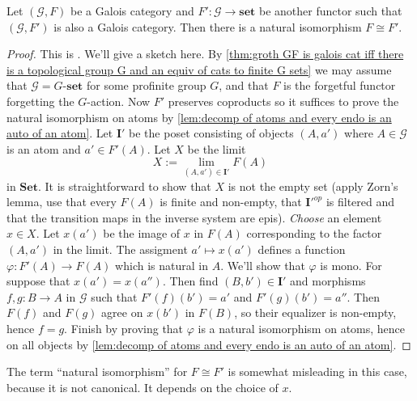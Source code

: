\begin{corollary}
\label{coro:Every two fundamental functors are naturally isomorphic}
Let $(\mathscr{G},F)$ be a Galois category and $F' : \mathscr{G} \to \mathbf{set}$ be another functor such that $(\mathscr{G},F')$ is also a Galois category. Then there is a natural isomorphism $F \cong F'$.
\end{corollary}
\begin{proof}
This is \cite[Corollary 8.48]{johnstone77}. We'll give a sketch here.
By \cref{thm:groth GF is galois cat iff there is a topological group G and an equiv of cats to finite G sets} we may assume that $\mathscr{G} = G\text{-}\mathbf{set}$ for some profinite group $G$, and that $F$ is the forgetful functor forgetting the $G$-action. Now $F'$ preserves coproducts so it suffices to prove the natural isomorphism on atoms by \cref{lem:decomp of atoms and every endo is an auto of an atom}. Let $\mathbf{I}'$ be the poset consisting of objects $(A,a')$ where $A \in \mathscr{G}$ is an atom and $a' \in F'(A)$. Let $X$ be the limit
\[ X := \lim_{(A,a') \in \mathbf{I}'}F(A) \]
in $\mathbf{Set}$. It is straightforward to show that $X$ is not the empty set (apply Zorn's lemma, use that every $F(A)$ is finite and non-empty, that $\mathbf{I}'^{op}$ is filtered and that the transition maps in the inverse system are epis). \emph{Choose} an element $x \in X$. Let $x(a')$ be the image of $x$ in $F(A)$ corresponding to the factor $(A,a')$ in the limit. The assigment $a' \mapsto x(a')$ defines a function $\varphi : F'(A) \to F(A)$ which is natural in $A$. We'll show that $\varphi$ is mono. For suppose that $x(a') = x(a'')$. Then find $(B,b') \in \mathbf{I}'$ and morphisms $f,g : B \to A$ in $\mathscr{G}$ such that $F'(f)(b') = a'$ and $F'(g)(b') = a''$. Then $F(f)$ and $F(g)$ agree on $x(b')$ in $F(B)$, so their equalizer is non-empty, hence $f=g$. Finish by proving that $\varphi$ is a natural isomorphism on atoms, hence on all objects by \cref{lem:decomp of atoms and every endo is an auto of an atom}. \qedhere

\end{proof}
The term ``natural isomorphism'' for $F \cong F'$ is somewhat misleading in this case, because it is not canonical. It depends on the choice of $x$.

